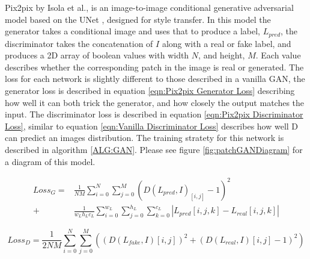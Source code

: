 \documentclass{UoYCSproject}
\begin{document}

Pix2pix by Isola et al.\cite{isola2018imagetoimage}, is an image-to-image conditional generative adversarial model based on the UNet \cite{ronneberger2015unet}, designed for style transfer. In this model the generator takes a conditional image and uses that to produce a label, $L_{pred}$, the discriminator takes the concatenation of $I$ along with a real or fake label, and produces a 2D array of boolean values with width $N$, and height, $M$. Each value describes whether the corresponding patch in the image is real or generated. The loss for each network is slightly different to those described in a vanilla GAN, the generator loss is described in equation \ref{eqn:Pix2pix Generator Loss} describing how well it can both trick the generator, and how closely the output matches the input. The discriminator loss is described in equation \ref{eqn:Pix2pix Discriminator Loss}, similar to equation \ref{eqn:Vanilla Discriminator Loss} describes how well D can predict an images distribution. The training stratety for this network is described in algorithm \ref{ALG:GAN}. Please see figure \ref{fig:patchGANDiagram} for a diagram of this model.

\begin{equation}
    \label{eqn:Pix2pix Generator Loss}
    \begin{split}
    Loss_G = & \frac{1}{NM} \sum_{i=0}^{N} \sum_{j=0}^{M} (D(L_{pred}, I)_{[i,j]} -1 )^2\\
           + & \frac{1}{w_Lh_Lc_L} \sum_{i=0}^{w_L} \sum_{j=0}^{h_L} \sum_{k=0}^{c_L} |L_{pred}[i,j,k] - L_{real}[i,j,k]|
    \end{split}    
\end{equation}

\begin{equation}
    \label{eqn:Pix2pix Discriminator Loss}
    Loss_D = \frac{1}{2NM} \sum_{i=0}^{N}  \sum_{j=0}^{M} ( (D(L_{fake}, I)[i,j] )^2 + (D(L_{real}, I)[i,j] - 1)^2)
\end{equation}
\end{document}
